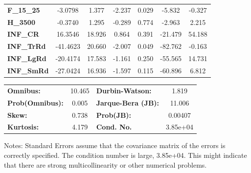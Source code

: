 \begin{center}
\begin{tabular}{lcccccc}
\textbf{F\_15\_25} &      -3.0798  &        1.377     &    -2.237  &         0.029        &       -5.832    &       -0.327     \\
\textbf{H\_3500}   &      -0.3740  &        1.295     &    -0.289  &         0.774        &       -2.963    &        2.215     \\
\textbf{INF\_CR}   &      16.3546  &       18.926     &     0.864  &         0.391        &      -21.479    &       54.188     \\
\textbf{INF\_TrRd} &     -41.4623  &       20.660     &    -2.007  &         0.049        &      -82.762    &       -0.163     \\
\textbf{INF\_LgRd} &     -20.4174  &       17.583     &    -1.161  &         0.250        &      -55.565    &       14.731     \\
\textbf{INF\_SmRd} &     -27.0424  &       16.936     &    -1.597  &         0.115        &      -60.896    &        6.812     \\
\bottomrule
\end{tabular}
\begin{tabular}{lclc}
\textbf{Omnibus:}       & 10.465 & \textbf{  Durbin-Watson:     } &    1.819  \\
\textbf{Prob(Omnibus):} &  0.005 & \textbf{  Jarque-Bera (JB):  } &   11.006  \\
\textbf{Skew:}          &  0.738 & \textbf{  Prob(JB):          } &  0.00407  \\
\textbf{Kurtosis:}      &  4.179 & \textbf{  Cond. No.          } & 3.85e+04  \\
\bottomrule
\end{tabular}
\end{center}

Notes: \newline
 [1] Standard Errors assume that the covariance matrix of the errors is correctly specified. \newline
 [2] The condition number is large, 3.85e+04. This might indicate that there are \newline
 strong multicollinearity or other numerical problems.